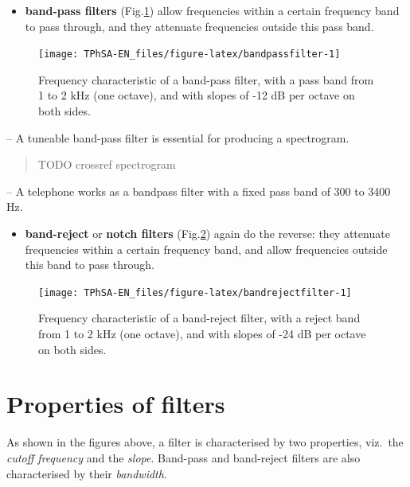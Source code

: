 \documentclass[
]{book}
\providecommand{\tightlist}{%
  \setlength{\itemsep}{0pt}\setlength{\parskip}{0pt}}
\begin{document}
\begin{itemize}
\tightlist
\item
  \textbf{band-pass filters} (Fig.\ref{fig:bandpassfilter}) allow frequencies within a certain frequency band to pass through, and they attenuate frequencies outside this pass band.
\end{itemize}

\begin{figure}

{\centering \texttt{[image: TPhSA-EN\_files/figure-latex/bandpassfilter-1]} 

}

\caption{Frequency characteristic of a band-pass filter, with a pass band from 1 to 2 kHz (one octave), and with slopes of -12 dB per octave on both sides.}\label{fig:bandpassfilter}
\end{figure}

-- A tuneable band-pass filter is essential for producing a spectrogram.

\begin{quote}
TODO crossref spectrogram
\end{quote}

-- A telephone works as a bandpass filter with a fixed pass band of 300 to 3400 Hz.

\begin{itemize}
\tightlist
\item
  \textbf{band-reject} or \textbf{notch filters} (Fig.\ref{fig:bandrejectfilter}) again do the reverse: they attenuate frequencies within a certain frequency band, and allow frequencies outside this band to pass through.
\end{itemize}

\begin{figure}

{\centering \texttt{[image: TPhSA-EN\_files/figure-latex/bandrejectfilter-1]} 

}

\caption{Frequency characteristic of a band-reject filter, with a reject band from 1 to 2 kHz (one octave), and with slopes of -24 dB per octave on both sides.}\label{fig:bandrejectfilter}
\end{figure}

\section{Properties of filters}\label{properties-of-filters}

As shown in the figures above, a filter is characterised by two properties, viz.~the \emph{cutoff frequency} and the \emph{slope}. Band-pass and band-reject filters are also characterised by their \emph{bandwidth}.
\end{document}

